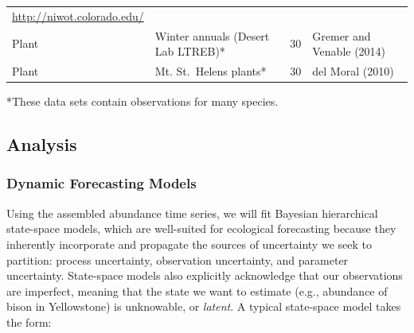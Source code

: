 \documentclass[12pt,]{article}
\begin{document}
\begin{longtable}[]{@{}llll@{}}
\begin{minipage}[t]{0.28\columnwidth}
\url{http://niwot.colorado.edu/}\strut
\end{minipage}\tabularnewline
\begin{minipage}[t]{0.06\columnwidth}\raggedright\strut
Plant\strut
\end{minipage} & \begin{minipage}[t]{0.32\columnwidth}\raggedright\strut
Winter annuals (Desert Lab LTREB)*\strut
\end{minipage} & \begin{minipage}[t]{0.22\columnwidth}\raggedright\strut
30\strut
\end{minipage} & \begin{minipage}[t]{0.28\columnwidth}\raggedright\strut
Gremer and Venable (2014)\strut
\end{minipage}\tabularnewline
\begin{minipage}[t]{0.06\columnwidth}\raggedright\strut
Plant\strut
\end{minipage} & \begin{minipage}[t]{0.32\columnwidth}\raggedright\strut
Mt. St.~Helens plants*\strut
\end{minipage} & \begin{minipage}[t]{0.22\columnwidth}\raggedright\strut
30\strut
\end{minipage} & \begin{minipage}[t]{0.28\columnwidth}\raggedright\strut
del Moral (2010)\strut
\end{minipage}\tabularnewline
\bottomrule
\end{longtable}

\vspace{-2em}

*These data sets contain observations for many species.

\normalsize

\subsection{Analysis}\subsubsection{Dynamic Forecasting Models}

Using the assembled abundance time series, we will fit
Bayesian hierarchical state-space models, which are
well-suited for ecological forecasting because they inherently
incorporate and propagate the sources of uncertainty we seek to
partition: process uncertainty, observation uncertainty, and parameter
uncertainty. State-space models also explicitly acknowledge that our
observations are imperfect, meaning that the state we want to estimate
(e.g., abundance of bison in Yellowstone) is unknowable,
or \emph{latent}. A typical state-space model takes the form:
\vspace{-2em}
\end{document}
